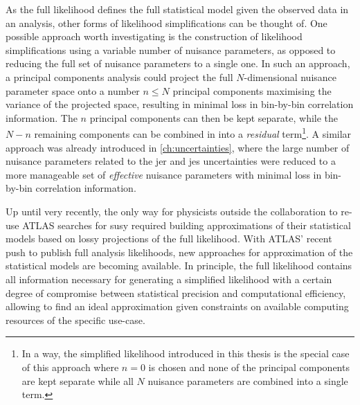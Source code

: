 As the full likelihood defines the full statistical model given the observed data in an analysis, other forms of likelihood simplifications can be thought of.
One possible approach worth investigating is the construction of likelihood simplifications using a variable number of nuisance parameters, as opposed to reducing the full set of nuisance parameters to a single one.
In such an approach, a principal components analysis could project the full $N$-dimensional nuisance parameter space onto a number $n\leq N$ principal components maximising the variance of the projected space, \ie resulting in minimal loss in bin-by-bin correlation information.
The $n$ principal components can then be kept separate, while the $N-n$ remaining components can be combined in into a \textit{residual} term\footnote{In a way, the simplified likelihood introduced in this thesis is the special case of this approach where $n=0$ is chosen and none of the principal components are kept separate while all $N$ nuisance parameters are combined into a single term.}.
A similar approach was already introduced in \cref{ch:uncertainties}, where the large number of nuisance parameters related to the \gls{jer} and \gls{jes} uncertainties were reduced to a more manageable set of \textit{effective} nuisance parameters with minimal loss in bin-by-bin correlation information. 

Up until very recently, the only way for physicists outside the collaboration to re-use ATLAS searches for \gls{susy} required building approximations of their statistical models based on lossy projections of the full likelihood.
With ATLAS' recent push to publish full analysis likelihoods, new approaches for approximation of the statistical models are becoming available.
In principle, the full likelihood contains all information necessary for generating a simplified likelihood with a certain degree of compromise between statistical precision and computational efficiency, allowing to find an ideal approximation given constraints on available computing resources of the specific use-case. 





